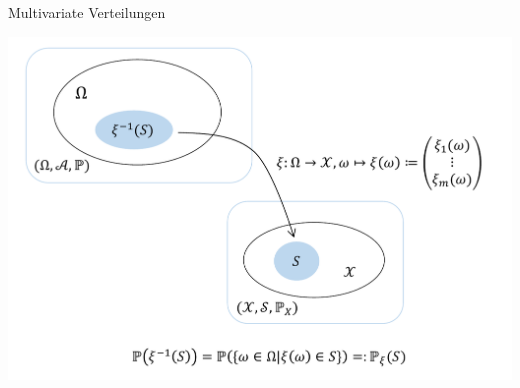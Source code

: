 \documentclass[
  8pt,
  ignorenonframetext,
]{beamer}
\begin{document}
\begin{frame}{Multivariate Verteilungen}
\protect\hypertarget{multivariate-verteilungen-2}{}
\vfill

\begin{center}\includegraphics[width=0.9\linewidth]{5_Abbildungen/mvda_5_zufallsvektor} \end{center}
\vfill
\end{frame}
\end{document}
